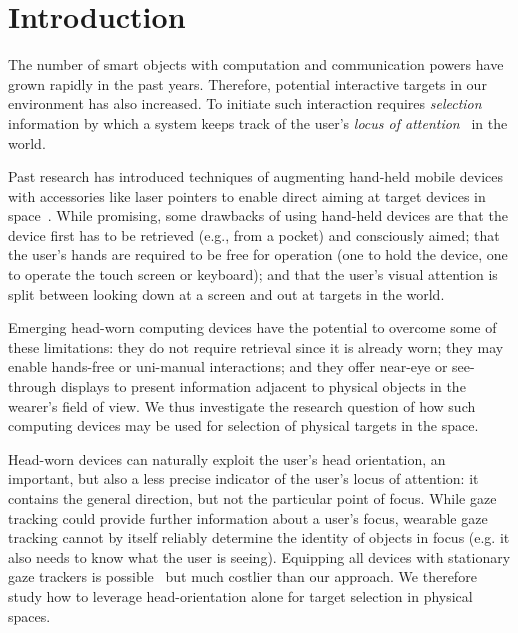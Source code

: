 \section{Introduction}

The number of smart objects with computation and communication powers have grown rapidly in the past years. Therefore, potential interactive targets in our environment has also increased.
To initiate such interaction requires {\em selection} information by which a system keeps track of the user's {\em locus of attention}~\cite{raskin} in the world. 

Past research has introduced techniques of augmenting hand-held mobile devices with accessories like laser pointers to enable direct aiming at target devices in space~\cite{beigl_point_1999,patel_2-way_2003}. While promising, some drawbacks of using hand-held devices are that the device first has to be retrieved (e.g., from a pocket) and consciously aimed; that the user's hands are required to be free for operation (one to hold the device, one to operate the touch screen or keyboard); and that the user's visual attention is split between looking down at a screen and out at targets in the world. 

Emerging head-worn computing devices have the potential to overcome some of these limitations: they do not require retrieval since it is already worn; they may enable hands-free or uni-manual interactions; and they offer near-eye or see-through displays to present information adjacent to physical objects in the wearer's field of view. We thus investigate the research question of how such computing devices may be used for selection of physical targets in the space.

Head-worn devices can naturally exploit the user's head orientation, an important, but also a less precise indicator of the user's locus of attention: it contains the general direction, but not the particular point of focus. While gaze tracking could provide further information about a user's focus, wearable gaze tracking cannot by itself reliably determine the identity of objects in focus (e.g. it also needs to know what the user is seeing). Equipping all devices with stationary gaze trackers is possible~\cite{vertegaal2005media} but much costlier than our approach. We therefore study how to leverage head-orientation alone for target selection in physical spaces. 

